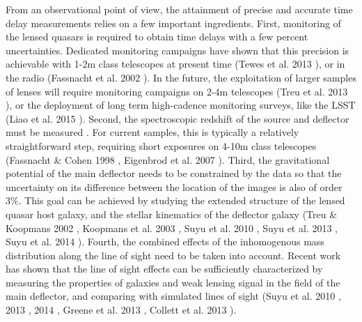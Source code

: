 \documentclass[a4paper,11pt]{article}
\begin{document}
From an observational point of view, the attainment of precise and
accurate time delay measurements relies on a few important
ingredients. First, monitoring of the lensed quasars is required to
obtain time delays with a few percent uncertainties. Dedicated
monitoring campaigns have shown that this precision is achievable with
1-2m class telescopes at present time (Tewes et al. 2013
\citep{2013A&A...556A..22T}), or in the radio (Fassnacht et al. 2002
\citep{2002ApJ...581..823F}). In the future, the exploitation of
larger samples of lenses will require monitoring campaigns on 2-4m
telescopes (Treu et al. 2013 \citep{2013arXiv1306.1272T}), or the
deployment of long term high-cadence monitoring surveys, like the LSST
(Liao et al. 2015 \citep{2015ApJ...800...11L}). Second, the
spectroscopic redshift of the source and deflector must be measured
. For current samples, this is typically a relatively straightforward
step, requiring short exposures on 4-10m class telescopes (Fassnacht
\& Cohen 1998 \citep{1998AJ....115..377F}, Eigenbrod et al. 2007
\citep{2007A&A...465...51E}).  Third, the gravitational potential of
the main deflector needs to be constrained by the data so that the
uncertainty on its difference between the location of the images is
also of order 3\%. This goal can be achieved by studying the extended
structure of the lensed quasar host galaxy, and the stellar kinematics
of the deflector galaxy (Treu \& Koopmans 2002
\citep{2002MNRAS.337L...6T}, Koopmans et al. 2003
\citep{2003ApJ...599...70K}, Suyu et al. 2010
\citep{2010ApJ...711..201S}, Suyu et al. 2013
\citep{2013ApJ...766...70S}, Suyu et al. 2014
\cite{2014ApJ...788L..35S}).  Fourth, the combined effects of the
inhomogenous mass distribution along the line of sight need to be
taken into account. Recent work has shown that the line of sight
effects can be sufficiently characterized by measuring the properties
of galaxies and weak lensing signal in the field of the main
deflector, and comparing with simulated lines of sight (Suyu et
al. 2010 \citep{2010ApJ...711..201S}, 2013
\citep{2013ApJ...766...70S}, 2014 \citep{2014ApJ...788L..35S}, Greene
et al. 2013 \citep{2013ApJ...768...39G}, Collett et al. 2013
\citep{2013MNRAS.432..679C}).
\end{document}
